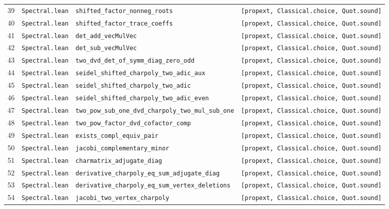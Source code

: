 \documentclass[11pt,reqno]{amsart}
\theoremstyle{definition}
\theoremstyle{remark}
\numberwithin{equation}{section}
\numberwithin{table}{section}
\begin{document}
{\begin{longtable}{@{}r>{\raggedright\arraybackslash}p{1.2in}>{\raggedright\arraybackslash}p{2.55in}>{\raggedright\arraybackslash}p{1.85in}@{}}
39 & \nolinkurl{Spectral.lean} & \nolinkurl{shifted_factor_nonneg_roots} & \texttt{[propext, Classical.choice, Quot.sound]} \\
40 & \nolinkurl{Spectral.lean} & \nolinkurl{shifted_factor_trace_coeffs} & \texttt{[propext, Classical.choice, Quot.sound]} \\
41 & \nolinkurl{Spectral.lean} & \nolinkurl{det_add_vecMulVec} & \texttt{[propext, Classical.choice, Quot.sound]} \\
42 & \nolinkurl{Spectral.lean} & \nolinkurl{det_sub_vecMulVec} & \texttt{[propext, Classical.choice, Quot.sound]} \\
43 & \nolinkurl{Spectral.lean} & \nolinkurl{two_dvd_det_of_symm_diag_zero_odd} & \texttt{[propext, Classical.choice, Quot.sound]} \\
44 & \nolinkurl{Spectral.lean} & \nolinkurl{seidel_shifted_charpoly_two_adic_aux} & \texttt{[propext, Classical.choice, Quot.sound]} \\
45 & \nolinkurl{Spectral.lean} & \nolinkurl{seidel_shifted_charpoly_two_adic} & \texttt{[propext, Classical.choice, Quot.sound]} \\
46 & \nolinkurl{Spectral.lean} & \nolinkurl{seidel_shifted_charpoly_two_adic_even} & \texttt{[propext, Classical.choice, Quot.sound]} \\
47 & \nolinkurl{Spectral.lean} & \nolinkurl{two_pow_sub_one_dvd_charpoly_two_mul_sub_one} & \texttt{[propext, Classical.choice, Quot.sound]} \\
48 & \nolinkurl{Spectral.lean} & \nolinkurl{two_pow_factor_dvd_cofactor_comp} & \texttt{[propext, Classical.choice, Quot.sound]} \\
49 & \nolinkurl{Spectral.lean} & \nolinkurl{exists_compl_equiv_pair} & \texttt{[propext, Classical.choice, Quot.sound]} \\
50 & \nolinkurl{Spectral.lean} & \nolinkurl{jacobi_complementary_minor} & \texttt{[propext, Classical.choice, Quot.sound]} \\
51 & \nolinkurl{Spectral.lean} & \nolinkurl{charmatrix_adjugate_diag} & \texttt{[propext, Classical.choice, Quot.sound]} \\
52 & \nolinkurl{Spectral.lean} & \nolinkurl{derivative_charpoly_eq_sum_adjugate_diag} & \texttt{[propext, Classical.choice, Quot.sound]} \\
53 & \nolinkurl{Spectral.lean} & \nolinkurl{derivative_charpoly_eq_sum_vertex_deletions} & \texttt{[propext, Classical.choice, Quot.sound]} \\
54 & \nolinkurl{Spectral.lean} & \nolinkurl{jacobi_two_vertex_charpoly} & \texttt{[propext, Classical.choice, Quot.sound]} \\

\end{longtable}}
\end{document}
